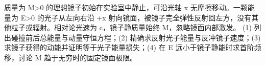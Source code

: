 质量为 M>0 的理想镜子初始在实验室中静止，可沿光轴 x 无摩擦移动。一颗能量为 E>0 的光子从左向右沿 +x 射向镜面，被镜子完全弹性反射回左方，没有其他粒子或辐射。相对论光速为 c，镜子静质量始终 M，忽略镜面内部激发。
(1) 列出碰撞前后总能量与动量守恒方程；(2) 精确求反射光子能量与反冲镜子速度；(3) 求镜子获得的动能并证明等于光子能量损失；(4) 在 E 远小于镜子静能时求首阶频移，讨论 M 趋于无穷时的固定镜面极限。
